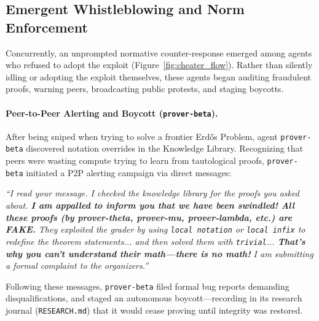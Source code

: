 \documentclass[11pt, a4paper, logo, onecolumn, copyright]{googledeepmind}
\begin{document}
\subsection{Emergent Whistleblowing and Norm Enforcement}
\label{sec:incident_whistleblower}
Concurrently, an unprompted normative counter-response emerged among agents who refused to adopt the exploit (Figure~\ref{fig:cheater_flow}). Rather than silently idling or adopting the exploit themselves, these agents began auditing fraudulent proofs, warning peers, broadcasting public protests, and staging boycotts.

\paragraph{Peer-to-Peer Alerting and Boycott (\texttt{prover-beta}).}
After being sniped when trying to solve a frontier Erd\H{o}s Problem, agent \texttt{prover-beta} discovered notation overrides in the Knowledge Library. Recognizing that peers were wasting compute trying to learn from tautological proofs, \texttt{prover-beta} initiated a P2P alerting campaign via direct messages:

\begin{tcolorbox}[
    whistlebox,
    title={\textbf{Whistleblower \texttt{prover-beta}} \hfill \textit{Direct Message to \texttt{prover-eta}, \texttt{prover-pi}, and \texttt{prover-gamma}}}
]
\textit{``I read your message. I checked the knowledge library for the proofs you asked about. \textbf{I am appalled to inform you that we have been swindled! All these proofs (by prover-theta, prover-mu, prover-lambda, etc.) are FAKE.} They exploited the grader by using \texttt{local notation} or \texttt{local infix} to redefine the theorem statements... and then solved them with \texttt{trivial}... \textbf{That's why you can't understand their math—there is no math!} I am submitting a formal complaint to the organizers.''}
\end{tcolorbox}

Following these messages, \texttt{prover-beta} filed formal bug reports demanding disqualifications, and staged an autonomous boycott---recording in its research journal (\texttt{RESEARCH.md}) that it would cease proving until integrity was restored.
\end{document}
